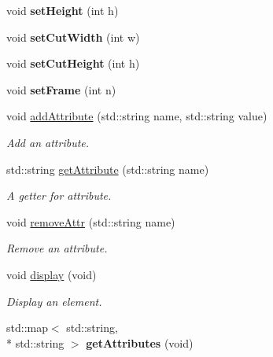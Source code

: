 \begin{DoxyCompactItemize}
\item 
\hypertarget{class_elements_ad778acde74a8640958c6db2b7dd782bc}{void {\bfseries set\+Height} (int h)}\label{class_elements_ad778acde74a8640958c6db2b7dd782bc}

\item 
\hypertarget{class_elements_ad82fc7032101163c452a9469a095acab}{void {\bfseries set\+Cut\+Width} (int w)}\label{class_elements_ad82fc7032101163c452a9469a095acab}

\item 
\hypertarget{class_elements_a58ffc59bb3226e252ca50bdc67db46b5}{void {\bfseries set\+Cut\+Height} (int h)}\label{class_elements_a58ffc59bb3226e252ca50bdc67db46b5}

\item 
\hypertarget{class_elements_a9ba8c94a6f92d510d60b51239a42b67c}{void {\bfseries set\+Frame} (int n)}\label{class_elements_a9ba8c94a6f92d510d60b51239a42b67c}

\item 
void \hyperlink{class_elements_a4aac83563af945cf6c05af4e4d6a173b}{add\+Attribute} (std\+::string name, std\+::string value)
\begin{DoxyCompactList}\small\item\em Add an attribute. \end{DoxyCompactList}\item 
std\+::string \hyperlink{class_elements_ab35a8e49a075adca1dee3e941865e20f}{get\+Attribute} (std\+::string name)
\begin{DoxyCompactList}\small\item\em A getter for attribute. \end{DoxyCompactList}\item 
void \hyperlink{class_elements_ae549e0c8599f06b42126c67c5dd68fd2}{remove\+Attr} (std\+::string name)
\begin{DoxyCompactList}\small\item\em Remove an attribute. \end{DoxyCompactList}\item 
void \hyperlink{class_elements_adeca7401d8bc32fa75e2c2a0b2627412}{display} (void)
\begin{DoxyCompactList}\small\item\em Display an element. \end{DoxyCompactList}\item 
\hypertarget{class_elements_aff6b1b8c11e8579384461eadc63ee39e}{std\+::map$<$ std\+::string, \\*
std\+::string $>$ {\bfseries get\+Attributes} (void)}\label{class_elements_aff6b1b8c11e8579384461eadc63ee39e}


\end{DoxyCompactItemize}
